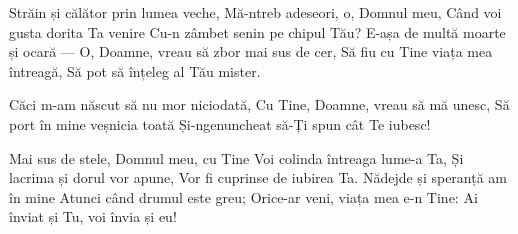 \beginverse
Străin și călător prin lumea veche,
Mă-ntreb adeseori, o, Domnul meu,
Când voi gusta dorita Ta venire
Cu-n zâmbet senin pe chipul Tău?
E-așa de multă moarte și ocară —
O, Doamne, vreau să zbor mai sus de cer,
Să fiu cu Tine viața mea întreagă,
Să pot să înțeleg al Tău mister.
\endverse

\beginchorus
Căci m-am născut să nu mor niciodată,
Cu Tine, Doamne, vreau să mă unesc,
Să port în mine veșnicia toată
Și-ngenuncheat să-Ți spun cât Te iubesc!
\endchorus

\beginverse
Mai sus de stele, Domnul meu, cu Tine
Voi colinda întreaga lume-a Ta,
Și lacrima și dorul vor apune,
Vor fi cuprinse de iubirea Ta.
Nădejde și speranță am în mine
Atunci când drumul este greu;
Orice-ar veni, viața mea e-n Tine:
Ai înviat și Tu, voi învia și eu!
\endverse
\endsong